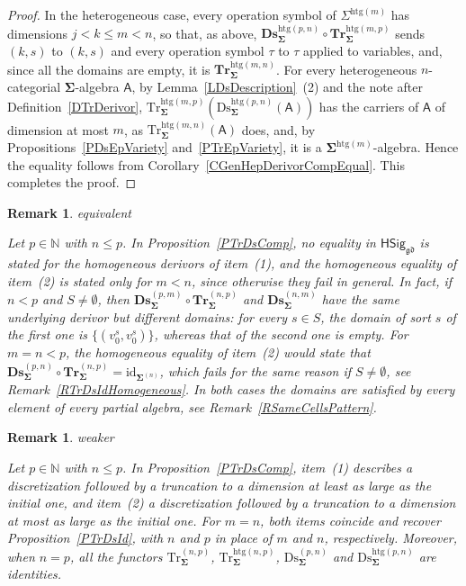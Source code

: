\documentclass[a4paper, reqno]{amsbook}
\makeatletter
\newcommand{\sig}[1]{\mathbf{#1}}             %
\newcommand{\calg}[1]{\boldsymbol{\mathsf{#1}}} %
\newcommand{\gd}{\mathfrak{gd}}              %
\newcommand{\htg}{\mathrm{htg}}                %
\newcommand{\id}{\mathrm{id}}
\newcommand{\Ds}{\mathrm{Ds}}
\newcommand{\Tr}{\mathrm{Tr}}
\newcommand{\bDs}{\mathbf{Ds}}
\newcommand{\bTr}{\mathbf{Tr}}
\theoremstyle{plain}
\newtheorem{remark}[theorem]{Remark}
\theoremstyle{definition}
\newcommand*{\CA@leanpending}{}
\newcommand*{\CA@leanrelation}{}
\newcommand*{\lean}[2]{%
  \ifcsname\string\color@lean@#1\endcsname\else
    \PackageError{main}{Unknown relation `#1' in \string\lean}{Use equivalent, weaker or stronger.}%
  \fi
  \gdef\CA@leanrelation{#1}%
  \gdef\CA@leanpending{#2}}
\makeatother
\begin{document}
\begin{proof}
In the heterogeneous case, every operation symbol of $\Sigma^{\htg(m)}$ has dimensions $j<k\leq m<n$, so that, as above, $\bDs^{\htg(p,n)}_{\sig{\Sigma}}\circ\bTr^{\htg(m,p)}_{\sig{\Sigma}}$ sends $(k,s)$ to $(k,s)$ and every operation symbol $\tau$ to $\tau$ applied to variables, and, since all the domains are empty, it is $\bTr^{\htg(m,n)}_{\sig{\Sigma}}$.
For every heterogeneous $n$-categorial $\sig{\Sigma}$-algebra $\calg{A}$, by Lemma~\ref{LDsDescription}~(2) and the note after Definition~\ref{DTrDerivor}, $\Tr^{\htg(m,p)}_{\sig{\Sigma}}(\Ds^{\htg(p,n)}_{\sig{\Sigma}}(\calg{A}))$ has the carriers of $\calg{A}$ of dimension at most $m$, as $\Tr^{\htg(m,n)}_{\sig{\Sigma}}(\calg{A})$ does, and, by Propositions~\ref{PDsEpVariety} and~\ref{PTrEpVariety}, it is a $\sig{\Sigma}^{\htg(m)}$-algebra.
Hence the equality follows from Corollary~\ref{CGenHepDerivorCompEqual}. This completes the proof.
\end{proof}

\begin{remark}\label{RTrDsCompHomogeneous}\lean{equivalent}{Dimensions.homogeneousMixed_upper_derivor,Dimensions.homogeneousMixed_upper_ne,Dimensions.homogeneousTruncation_discretization_ne}
Let $p\in\mathbb{N}$ with $n\leq p$.
In Proposition~\ref{PTrDsComp}, no equality in $\mathsf{HSig}_{\gd}$ is stated for the homogeneous derivors of item~(1), and the homogeneous equality of item~(2) is stated only for $m<n$, since otherwise they fail in general.
In fact, if $n<p$ and $S\neq\emptyset$, then $\bDs^{(p,m)}_{\sig{\Sigma}}\circ\bTr^{(n,p)}_{\sig{\Sigma}}$ and $\bDs^{(n,m)}_{\sig{\Sigma}}$ have the same underlying derivor but different domains: for every $s\in S$, the domain of sort $s$ of the first one is $\{(v^s_0,v^s_0)\}$, whereas that of the second one is empty.
For $m=n<p$, the homogeneous equality of item~(2) would state that $\bDs^{(p,n)}_{\sig{\Sigma}}\circ\bTr^{(n,p)}_{\sig{\Sigma}}=\id_{\sig{\Sigma}^{(n)}}$, which fails for the same reason if $S\neq\emptyset$, see Remark~\ref{RTrDsIdHomogeneous}.
In both cases the domains are satisfied by every element of every partial algebra, see Remark~\ref{RSameCellsPattern}.
\end{remark}

\begin{remark}\label{RTrDsCompOverlap}\lean{weaker}{Dimensions.homogeneousTruncation_self,Dimensions.homogeneousDiscretization_self,Dimensions.heterogeneousTruncation_self,Dimensions.heterogeneousDiscretization_self,GeneralizedHepDerivor.epIdentityIso}
Let $p\in\mathbb{N}$ with $n\leq p$.
In Proposition~\ref{PTrDsComp}, item~(1) describes a discretization followed by a truncation to a dimension at least as large as the initial one, and item~(2) a discretization followed by a truncation to a dimension at most as large as the initial one.
For $m=n$, both items coincide and recover Proposition~\ref{PTrDsId}, with $n$ and $p$ in place of $m$ and $n$, respectively.
Moreover, when $n=p$, all the functors $\Tr^{(n,p)}_{\sig{\Sigma}}$, $\Tr^{\htg(n,p)}_{\sig{\Sigma}}$, $\Ds^{(p,n)}_{\sig{\Sigma}}$ and $\Ds^{\htg(p,n)}_{\sig{\Sigma}}$ are identities.
\end{remark}
\end{document}
